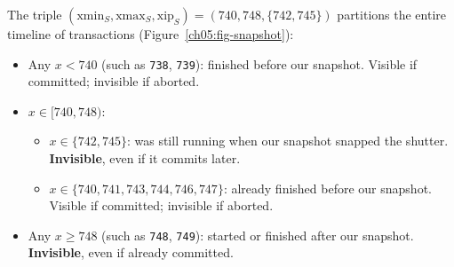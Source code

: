 The triple $(\mathrm{xmin}_S, \mathrm{xmax}_S, \mathrm{xip}_S) = (740, 748, \{742, 745\})$ partitions the entire timeline of transactions (Figure~\ref{ch05:fig-snapshot}):
\begin{itemize}
  \item Any $x < 740$ (such as \texttt{738}, \texttt{739}): finished before our snapshot. Visible if committed; invisible if aborted.
  \item $x \in [740, 748)$:
    \begin{itemize}
      \item $x \in \{742, 745\}$: was still running when our snapshot snapped the shutter. \textbf{Invisible}, even if it commits later.
      \item $x \in \{740, 741, 743, 744, 746, 747\}$: already finished before our snapshot. Visible if committed; invisible if aborted.
    \end{itemize}
  \item Any $x \ge 748$ (such as \texttt{748}, \texttt{749}): started or finished after our snapshot. \textbf{Invisible}, even if already committed.
\end{itemize}

